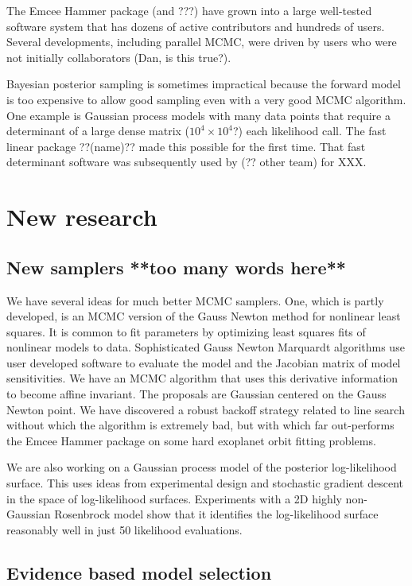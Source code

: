 \documentclass[12pt]{article}
\begin{document}
The Emcee Hammer package (and ???) have grown into a large well-tested software system
that has dozens of active contributors and hundreds of users.
Several developments, including parallel MCMC, were driven by users who were not
initially collaborators (Dan, is this true?).

Bayesian posterior sampling is sometimes impractical because the forward model is too 
expensive to allow good sampling even with a very good MCMC algorithm.
One example is Gaussian process models with many data points that require a determinant
of a large dense matrix ($10^4\times 10^4$?) each likelihood call.
The fast linear package ??(name)?? made this possible for the first time.
That fast determinant software was subsequently used by (?? other team) for XXX.

\section*{New research}
\subsection*{New samplers **too many words here**}
We have several ideas for much better MCMC samplers.
One, which is partly developed, is an MCMC version of the Gauss Newton method for
nonlinear least squares.
It is common to fit parameters by optimizing least squares fits of nonlinear models to data.
Sophisticated Gauss Newton Marquardt algorithms use user developed software to evaluate the 
model and the Jacobian matrix of model sensitivities.
We have an MCMC algorithm that uses this derivative information to become affine invariant.
The proposals are Gaussian centered on the Gauss Newton point.
We have discovered a robust backoff strategy related to line search without which the 
algorithm is extremely bad, but with which far out-performs the Emcee Hammer package on 
some hard exoplanet orbit fitting problems.

We are also working on a Gaussian process model of the posterior log-likelihood surface.
This uses ideas from experimental design and stochastic gradient descent in the space of
log-likelihood surfaces.
Experiments with a 2D highly non-Gaussian Rosenbrock model show that it identifies
the log-likelihood surface reasonably well in just 50 likelihood evaluations.


\subsection*{Evidence based model selection}
\end{document}
